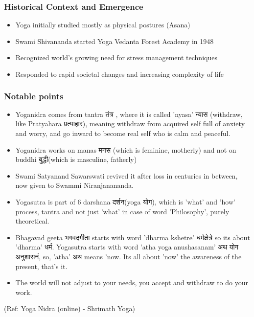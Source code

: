 \begin{frame}[fragile]\frametitle{Historical Context and Emergence}
    \begin{itemize}
        \item Yoga initially studied mostly as physical postures (Asana)
        \item Swami Shivananda started Yoga Vedanta Forest Academy in 1948
        \item Recognized world's growing need for stress management techniques
        \item Responded to rapid societal changes and increasing complexity of life
    \end{itemize}
\end{frame}

\begin{frame}[fragile]\frametitle{Notable points}
    \begin{itemize}
        \item Yoganidra comes from tantra तंत्र  , where it is called 'nyasa' न्यास (withdraw, like Pratyahara प्रत्याहार), meaning withdraw from acquired self full of anxiety and worry, and go inward to become real self who is calm and peaceful.
		\item Yoganidra works on manas मनस  (which is feminine, motherly) and not on buddhi बुद्धी(which is masculine, fatherly)
		\item Swami Satyanand Sawarswati revived it after loss in centuries in between, now given to Swammi Niranjanananda.
		\item Yogasutra is part of 6 darshana दर्शन(yoga योग), which is 'what' and 'how' process, tantra and not just 'what' in case of word 'Philosophy', purely theoretical.
		\item Bhagavad geeta भगवदगीता  starts with word 'dharma kshetre' धर्मक्षेत्रे   so its about 'dharma' धर्म.    Yogasutra starts with word 'atha yoga anushasanam' अथ  योग अनुशासनं, so, 'atha' अथ means 'now. Its all about 'now' the awareness of the present, that's it.
		\item The world will not adjust to your needs, you accept and withdraw to do your work.
    \end{itemize}
	
	{\tiny (Ref: Yoga Nidra (online) - Shrimath Yoga)}

\end{frame}

